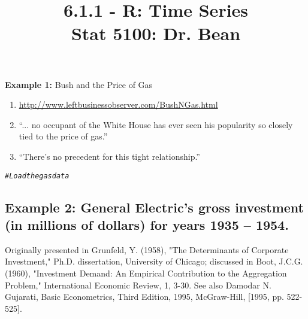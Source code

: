 \documentclass{article}\usepackage[]{graphicx}\usepackage[]{color}
\makeatletter
\newcommand{\hlcom}[1]{\textcolor[rgb]{0.678,0.584,0.686}{\textit{#1}}}%
\newenvironment{kframe}{%
 \def\at@end@of@kframe{}%
 \ifinner\ifhmode%
  \def\at@end@of@kframe{\end{minipage}}%
  \begin{minipage}{\columnwidth}%
 \fi\fi%
 \def\FrameCommand##1{\hskip\@totalleftmargin \hskip-\fboxsep
 \colorbox{shadecolor}{##1}\hskip-\fboxsep
     \hskip-\linewidth \hskip-\@totalleftmargin \hskip\columnwidth}%
 \MakeFramed {\advance\hsize-\width
   \@totalleftmargin\z@ \linewidth\hsize
   \@setminipage}}%
 {\par\unskip\endMakeFramed%
 \at@end@of@kframe}
\newenvironment{knitrout}{}{} %
\makeatother
\begin{document}
\title{%
  6.1.1 - R: Time Series \\
  \smallskip
  \large Stat 5100: Dr. Bean
}
\date{}

\maketitle

\textbf{Example 1: } Bush and the Price of Gas

\begin{enumerate}
  \item \href{http://www.leftbusinessobserver.com/BushNGas.html}{http://www.leftbusinessobserver.com/BushNGas.html}
  \item ``... no occupant of the White House has ever seen his popularity so closely tied to the price of gas.''
  \item ``There's no precedent for this tight relationship.''
\end{enumerate}

\begin{knitrout}
\color{fgcolor}\begin{kframe}
\begin{alltt}
\hlcom{# Load the gas data}
\end{alltt}
\end{kframe}
\end{knitrout}

\newpage

\subsection*{Example 2: General Electric’s gross investment (in millions of dollars) for years 1935 – 1954.}

Originally presented in Grunfeld, Y. (1958), "The Determinants of Corporate Investment," Ph.D. dissertation, University of Chicago; discussed in Boot, J.C.G. (1960), "Investment Demand: An Empirical Contribution to the Aggregation Problem," International Economic Review, 1, 3-30. See also Damodar N. Gujarati, Basic Econometrics, Third Edition, 1995, McGraw-Hill, [1995, pp. 522-525].
\end{document}
